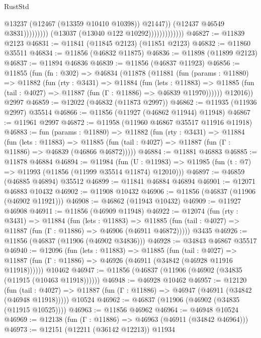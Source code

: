 \begin{lexlean}{RustStd}
\begin{coremodule}
                                              @13237
                                              (@12467 (@13359 @10410 @10398))
                                              @21447))
                                          (@12437 @46549 @3831)))))))))
                          (@13037 (@13040 @122 @10292)))))))))))))
@46827 := @11839 @2123
@46831 := @11841 (@11845 @2123) (@11851 @2123)
@46832 := @11860 @35511
@46834 := @11856 (@46832 @11875)
@46836 := @11898 (@11899 @2123)
@46837 := @11894 @46836
@46839 := @11856 (@46837 @11923)
@46856 := @11855
    (fun (fn : @302) =>
    @46834
      (@11878
        (@11881
          (fun (params : @11880) =>
          @11882
            (fun (rty : @3431) =>
            @11884
              (fun (lets : @11883) =>
              @11885 (fun (tail : @4027) => @11887 (fun (Γ : @11886) => @46839 @11970))))))
        @12016))
    @2997
@46859 := @12022 (@46832 (@11873 @2997))
@46862 := @11935 (@11936 @2997) @35514
@46866 := @11856 (@11927 (@46862 @11944) @11948)
@46867 := @11961 @2997
@46872 := @11958 (@11960 @46867 @35517 @11916 @11918)
@46883 := fun (params : @11880) =>
  @11882
    (fun (rty : @3431) =>
    @11884
      (fun (lets : @11883) =>
      @11885 (fun (tail : @4027) => @11887 (fun (Γ : @11886) => @46839 (@46866 @46872)))))
@46884 := @11881 @46883
@46885 := @11878 @46884
@46894 := @11984
    (fun (U : @11983) => @11985 (fun (t : @7) => @11993 (@11856 (@11999 @35514 @11874) @12010)))
@46897 := @46859 (@46885 @46894) @35512
@46899 := @11841 @46884 @46894
@46901 := @12071 @46883 @10432
@46902 := @11908 @10432
@46906 := @11856 (@46837 (@11906 (@46902 @11921)))
@46908 := @46862 (@11943 @10432)
@46909 := @11927 @46908
@46911 := @11856 (@46909 @11948)
@46922 := @12074
    (fun (rty : @3431) =>
    @11884
      (fun (lets : @11883) =>
      @11885 (fun (tail : @4027) => @11887 (fun (Γ : @11886) => @46906 (@46911 @46872)))))
    @3435
@46926 := @11856 (@46837 (@11906 (@46902 @34836)))
@46928 := @34843 @46867 @35517
@46940 := @12096
    (fun (lets : @11883) =>
    @11885
      (fun (tail : @4027) =>
      @11887 (fun (Γ : @11886) => @46926 (@46911 (@34842 (@46928 @11916 @11918))))))
    @10462
@46947 := @11856 (@46837 (@11906 (@46902 (@34835 (@11915 (@10463 @11918))))))
@46948 := @46928 @10462
@46957 := @12120
    (fun (tail : @4027) => @11887 (fun (Γ : @11886) => @46947 (@46911 (@34842 (@46948 @11918)))))
    @10524
@46962 := @46837 (@11906 (@46902 (@34835 (@11915 @10525))))
@46963 := @11856 @46962
@46964 := @46948 @10524
@46969 := @12138 (fun (Γ : @11886) => @46963 (@46911 (@34842 @46964)))
@46973 := @12151 (@12211 (@36142 @12213)) @11934

\end{coremodule}
\end{lexlean}
